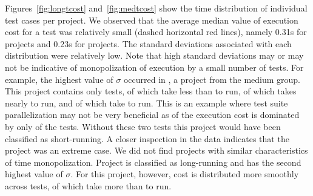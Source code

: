 \sloppy Figures~\ref{fig:longtcost} and~\ref{fig:medtcost} show the
time distribution of individual test cases per project.  We observed
that the average median value of execution cost for a test was
relatively small (dashed horizontal red lines), namely 0.31s for
\medg{} projects and 0.23s for \longg{} projects.  The standard
deviations associated with each distribution were relatively
low.  Note that high standard
deviations may or may not be indicative of monopolization of execution
by a small number of tests.  For example, the highest value of
$\sigma$ occurred in , a project from the
medium group.  This project contains only  tests,  of
which take less than  to run,  of which takes nearly
 to run, and  of which take  to run.  This is
an example where test suite parallelization may not be very beneficial
as  of the execution cost is dominated by only 
of the tests.  Without these two tests this project would have been
classified as short-running.  A closer inspection in the data
indicates that the project  was an extreme
case.  We did not find projects with similar characteristics of time
monopolization.  Project  is
classified as long-running and has the second highest value of
$\sigma$.  For this project, however, cost is distributed more
smoothly across  tests, of which  take more
than  to run.

